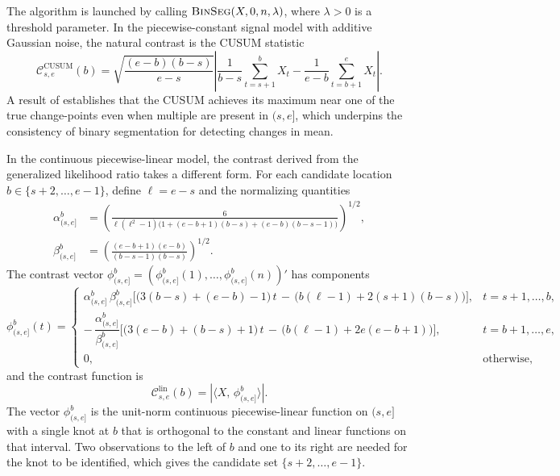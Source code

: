 \documentclass[12pt, a4paper]{article}
\begin{document}
\noindent The algorithm is launched by calling $\textsc{BinSeg}(X, 0, n, \lambda)$, where $\lambda > 0$ is a threshold parameter. In the piecewise-constant signal model with additive Gaussian noise, the natural contrast is the CUSUM statistic
\begin{equation}
\label{eq:cusum}
    \mathcal{C}^{\mathrm{CUSUM}}_{s,e}(b) = \sqrt{\frac{(e-b)(b-s)}{e-s}} \left| \frac{1}{b-s}\sum_{t=s+1}^{b} X_t - \frac{1}{e-b}\sum_{t=b+1}^{e} X_t \right|.
\end{equation}
A result of \cite{venkatraman1993} establishes that the CUSUM achieves its maximum near one of the true change-points even when multiple are present in $(s, e]$, which underpins the consistency of binary segmentation for detecting changes in mean.

In the continuous piecewise-linear model, the contrast derived from the generalized likelihood ratio \citep{bcf16} takes a different form. For each candidate location $b \in \{s+2, \ldots, e-1\}$, define $\ell = e - s$ and the normalizing quantities
{\small
\begin{equation}
\label{eq:alpha_beta}
\begin{aligned}
\alpha^b_{(s,e]}
&= \left(\frac{6}{\ell(\ell^2 - 1)\big(1 + (e\!-\!b\!+\!1)(b\!-\!s) + (e\!-\!b)(b\!-\!s\!-\!1)\big)}\right)^{\!1/2}\!\!\!, \\
\beta^b_{(s,e]}
&= \left(\frac{(e-b+1)(e-b)}{(b-s-1)(b-s)}\right)^{\!1/2}\!\!\!.
\end{aligned}
\end{equation}
}
The contrast vector $\phi^b_{(s,e]} = (\phi^b_{(s,e]}(1), \ldots, \phi^b_{(s,e]}(n))'$ has components
{\footnotesize
\begin{equation}
\label{eq:contrast_vector}
\phi^b_{(s,e]}(t) = \begin{cases}
\alpha^b_{(s,e]} \, \beta^b_{(s,e]} \Big[\big(3(b\!-\!s)+(e\!-\!b)-1\big)\, t \,-\, \big(b(\ell-1)+2(s+1)(b-s)\big)\Big], & t = s\!+\!1, \ldots, b, \\[6pt]
-\,\dfrac{\alpha^b_{(s,e]}}{\beta^b_{(s,e]}} \Big[\big(3(e\!-\!b)+(b\!-\!s)+1\big)\, t \,-\, \big(b(\ell-1)+2e(e-b+1)\big)\Big], & t = b\!+\!1, \ldots, e, \\[6pt]
0, & \text{otherwise},
\end{cases}
\end{equation}
}
and the contrast function is
\begin{equation}
\label{eq:lin_contrast}
    \mathcal{C}^{\mathrm{lin}}_{s,e}(b) = \left| \langle X, \, \phi^b_{(s,e]} \rangle \right|.
\end{equation}
The vector $\phi^b_{(s,e]}$ is the unit-norm continuous piecewise-linear function on $(s,e]$ with a single knot at $b$ that is orthogonal to the constant and linear functions on that interval. Two observations to the left of $b$ and one to its right are needed for the knot to be identified, which gives the candidate set $\{s+2, \ldots, e-1\}$.
\end{document}
